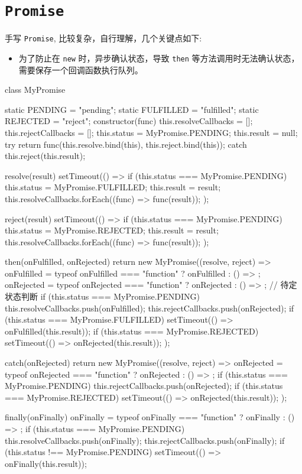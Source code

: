 \section{\texttt{Promise}}

手写 \texttt{Promise}, 比较复杂，自行理解，几个关键点如下:
\begin{itemize}
  \item 为了防止在 \texttt{new} 时，异步确认状态，导致 \texttt{then} 等方法调用时无法确认状态，需要保存一个回调函数执行队列。
\end{itemize}

\begin{JavaScript}
class MyPromise {
  static PENDING = "pending";
  static FULFILLED = "fulfilled";
  static REJECTED = "reject";
  constructor(func) {
    this.resolveCallbacks = [];
    this.rejectCallbacks = [];
    this.status = MyPromise.PENDING;
    this.result = null;
    try {
      return func(this.resolve.bind(this), this.reject.bind(this));
    } catch {
      this.reject(this.result);
    }
  }

  resolve(result) {
    setTimeout(() => {
      if (this.status === MyPromise.PENDING) {
        this.status = MyPromise.FULFILLED;
        this.result = result;
        this.resolveCallbacks.forEach((func) => func(result));
      }
    });
  }

  reject(result) {
    setTimeout(() => {
      if (this.status === MyPromise.PENDING) {
        this.status = MyPromise.REJECTED;
        this.result = result;
        this.resolveCallbacks.forEach((func) => func(result));
      }
    });
  }

  then(onFulfilled, onRejected) {
    return new MyPromise((resolve, reject) => {
      onFulfilled = typeof onFulfilled === "function" ? onFulfilled : () => {};
      onRejected = typeof onRejected === "function" ? onRejected : () => {};
      // 待定状态判断
      if (this.status === MyPromise.PENDING) {
        this.resolveCallbacks.push(onFulfilled);
        this.rejectCallbacks.push(onRejected);
      }
      if (this.status === MyPromise.FULFILLED) {
        setTimeout(() => onFulfilled(this.result));
      }
      if (this.status === MyPromise.REJECTED) {
        setTimeout(() => onRejected(this.result));
      }
    });
  }

  catch(onRejected) {
    return new MyPromise((resolve, reject) => {
      onRejected = typeof onRejected === "function" ? onRejected : () => {};
      if (this.status === MyPromise.PENDING) {
        this.rejectCallbacks.push(onRejected);
      }
      if (this.status === MyPromise.REJECTED) {
        setTimeout(() => onRejected(this.result));
      }
    });
  }

  finally(onFinally) {
    onFinally = typeof onFinally === "function" ? onFinally : () => {};
    if (this.status === MyPromise.PENDING) {
      this.resolveCallbacks.push(onFinally);
      this.rejectCallbacks.push(onFinally);
    }
    if (this.status !== MyPromise.PENDING) {
      setTimeout(() => onFinally(this.result));
    }
  }
}
\end{JavaScript}